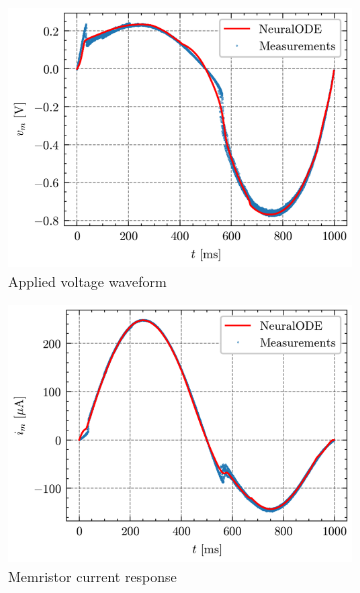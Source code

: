 \documentclass[11pt, oneside]{article}
\begin{document}
\newcommand{\subwidth}{0.32\linewidth}
\begin{figure}[H]
    \centering
    \begin{subfigure}[b]{\subwidth}
        \includegraphics[width=\linewidth]{sample_results/v_m.png}
        \caption{Applied voltage waveform}
    \end{subfigure}
    \begin{subfigure}[b]{\subwidth}
        \includegraphics[width=\linewidth]{sample_results/i_m.png}
        \caption{Memristor current response}
    \end{subfigure}
    \begin{subfigure}[b]{\subwidth}

\end{subfigure}
\end{figure}
\end{document}
